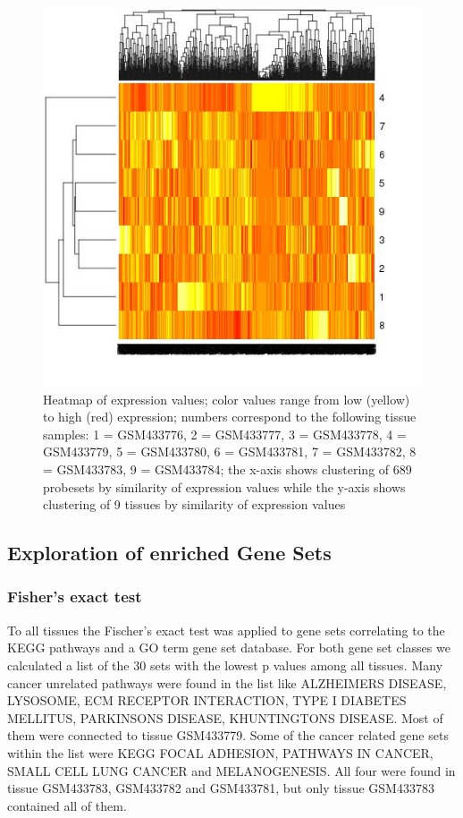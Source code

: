 \begin{figure}[h]
 \centering
 \includegraphics[scale=0.60,keepaspectratio=true]{../R/heatmap.jpg}
 \caption{Heatmap of expression values; color values range from low (yellow) to
high (red) expression; numbers correspond to the following tissue samples: 1 =
GSM433776, 2 = GSM433777, 3 = GSM433778, 4 = GSM433779, 5 = GSM433780, 6 =
GSM433781, 7 = GSM433782, 8 = GSM433783, 9 = GSM433784; the x-axis shows
clustering of 689 probesets by similarity of expression values while the y-axis
shows clustering of 9 tissues by similarity of expression values}
 \label{fig:heatmap}
\end{figure}

\subsection{Exploration of enriched Gene Sets}

\subsubsection{Fisher's exact test}

To all tissues the Fischer's exact test was applied to gene sets correlating to
the KEGG pathways and a GO term gene set database. For both gene set classes we
calculated a list of the 30 sets with the lowest p values among all tissues.
Many cancer unrelated pathways were found in the list like ALZHEIMERS DISEASE,
LYSOSOME, ECM RECEPTOR INTERACTION, TYPE I DIABETES MELLITUS, PARKINSONS
DISEASE, KHUNTINGTONS DISEASE. Most of them were connected to tissue GSM433779.
Some of the cancer related gene sets within the list were KEGG FOCAL ADHESION,
PATHWAYS IN CANCER, SMALL CELL LUNG CANCER and MELANOGENESIS. All four were
found in tissue GSM433783, GSM433782 and GSM433781, but only tissue GSM433783
contained all of them.


